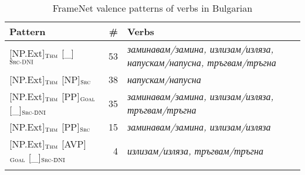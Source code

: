 \documentclass[output=paper,colorlinks,citecolor=brown]{langscibook}
\begin{document}
\begin{table}
   \begin{tabularx}{\textwidth}{ lrQ } 
   \lsptoprule
   Pattern & \# & Verbs \\ \midrule
{[NP.Ext]}$_{\text{\textsc{Thm}}}$ {[\_]}$_{\text{\textsc{Src-DNI}}}$ & 53 & \textit{заминавам\slash замина, излизам\slash изляза, напускам\slash напусна, тръгвам\slash тръгна}\\ 
{[NP.Ext]}$_{\text{\textsc{Thm}}}$ {[NP]}$_{\text{\textsc{Src}}}$ & 38 & \textit{напускам\slash напусна}\\ 
{[NP.Ext]}$_{\text{\textsc{Thm}}}$ {[PP]}$_{\text{\textsc{Goal}}}$ {[\_]}$_{\text{\textsc{Src-DNI}}}$ & 35 & \textit{заминавам\slash замина, излизам\slash изляза, тръгвам\slash тръгна}\\ 
{[NP.Ext]}$_{\text{\textsc{Thm}}}$ {[PP]}$_{\text{\textsc{Src}}}$ & 15 & \textit{заминавам\slash замина, излизам\slash изляза}\\ 
{[NP.Ext]}$_{\text{\textsc{Thm}}}$ {[AVP]}$_{\text{\textsc{Goal}}}$ {[\_]}$_{\text{\textsc{Src-DNI}}}$ & 4 & \textit{излизам\slash изляза, тръгвам\slash тръгна}\\ 
\lspbottomrule
\end{tabularx}
    \caption{FrameNet valence patterns of  verbs in Bulgarian}
    \label{tab:4:departing-valence-bg}
\end{table}
\end{document}
